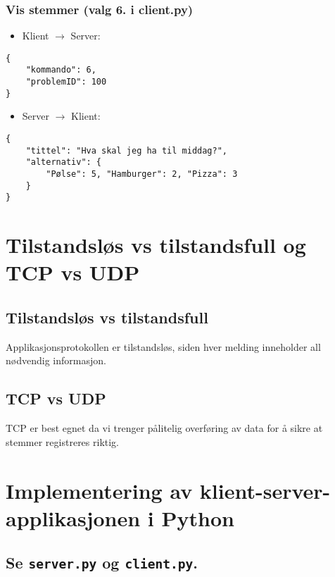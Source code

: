 \documentclass[hidelinks]{article}
\begin{document}
\subsubsection{Vis stemmer (valg 6. i client.py)}

\begin{itemize}
    \item Klient \(\rightarrow\) Server:
\end{itemize}

\begin{verbatim}
{
    "kommando": 6,
    "problemID": 100
}
\end{verbatim}

\begin{itemize}
    \item Server \(\rightarrow\) Klient:
\end{itemize}

\begin{verbatim}
{
    "tittel": "Hva skal jeg ha til middag?",
    "alternativ": {
        "Pølse": 5, "Hamburger": 2, "Pizza": 3
    }
}
\end{verbatim}

\section{Tilstandsløs vs tilstandsfull og TCP vs UDP}

\subsection{Tilstandsløs vs tilstandsfull}

Applikasjonsprotokollen er tilstandsløs, siden hver melding inneholder all nødvendig informasjon.

\subsection{TCP vs UDP}

TCP er best egnet da vi trenger pålitelig overføring av data for å sikre at stemmer registreres riktig.

\section{Implementering av klient-server-applikasjonen i Python}

\subsection{Se \texttt{server.py} og \texttt{client.py}.}
\end{document}
